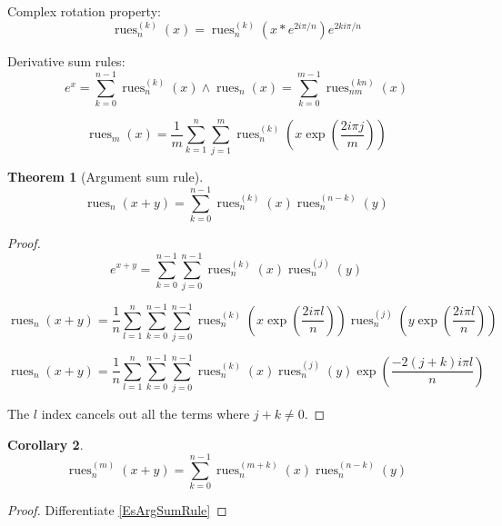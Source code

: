\documentclass[]{article}
\DeclareMathOperator{\rues}{rues}
\newcommand{\pqty}[1]{{\left(#1\right)}}
\newtheorem{theorem}{Theorem}[section]
\newtheorem{corollary}[theorem]{Corollary}
\numberwithin{equation}{section}
\begin{document}
	Complex rotation property:
	\begin{equation}
	\rues_n^{(k)}\pqty{x}=
	\rues_n^{(k)}\pqty{x*e^{2i\pi/n}}e^{2ki\pi/n}
	\end{equation}
	
	Derivative sum rules:
	\begin{equation}
	e^x=\sum_{k=0}^{n-1}\rues_n^{(k)}\pqty{x}\land\rues_n\pqty{x}=\sum_{k=0}^{m-1}\rues_{nm}^{(kn)}\pqty{x}
	\end{equation}
	
	\begin{equation}
	\rues_m\pqty{x}=
	\frac{1}{m}
	\sum_{k=1}^{n}\sum_{j=1}^{m}\rues_n^{(k)}\pqty{x\exp\pqty{\frac{2 i \pi j}{m}}}
	\end{equation}
	
	\begin{theorem}[Argument sum rule]
		\begin{equation}
		\label{EsArgSumRule}
		\rues_n\pqty{x+y}=
		\sum_{k=0}^{n-1}
		\rues_n^{(k)}\pqty{x}
		\rues_n^{(n-k)}\pqty{y}
		\end{equation}
	\end{theorem}
	\begin{proof}
		\begin{equation}
		e^{x+y}=\sum_{k=0}^{n-1}\sum_{j=0}^{n-1}\rues_n^{(k)}\pqty{x}\rues_n^{(j)}\pqty{y}
		\end{equation}
		
		\begin{equation}
		\rues_n\pqty{x+y}=
		\frac{1}{n}\sum _{l=1}^n \sum_{k=0}^{n-1}\sum_{j=0}^{n-1}
		\rues_n^{(k)}\pqty{x\exp\pqty{\frac{2 i \pi  l}{n}}}
		\rues_n^{(j)}\pqty{y\exp\pqty{\frac{2 i \pi  l}{n}}}
		\end{equation}
		
		\begin{equation}
		\rues_n\pqty{x+y}=
		\frac{1}{n}\sum _{l=1}^n \sum_{k=0}^{n-1}\sum_{j=0}^{n-1}
		\rues_n^{(k)}\pqty{x}
		\rues_n^{(j)}\pqty{y}
		\exp\pqty{\frac{-2(j+k) i \pi  l}{n}}
		\end{equation}
		
		The \(l\) index cancels out all the terms where \(j+k\neq 0\).
	\end{proof}

	\begin{corollary}
		\begin{equation}
			\label{EsmArgSumRule}
			\rues_n^{(m)}\pqty{x+y}=
			\sum_{k=0}^{n-1}
			\rues_n^{(m+k)}\pqty{x}
			\rues_n^{(n-k)}\pqty{y}
		\end{equation}
	\end{corollary}
	\begin{proof}
		Differentiate \eqref{EsArgSumRule}
	\end{proof}
\end{document}
